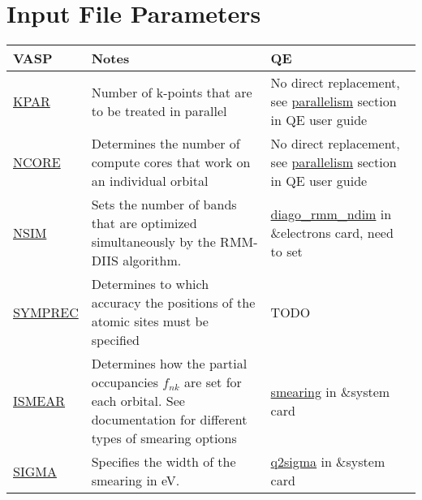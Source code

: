 \documentclass[12pt]{article}
\begin{document}
\section*{Input File Parameters}
\begin{center}
\begin{table}[ht]
\begin{tabularx}{\linewidth}{|>{\RaggedRight}p{2.5cm}|x|x|}\hline
 VASP  & Notes & QE \\ \hline
 
 
 \href{https://www.vasp.at/wiki/index.php/KPAR}{KPAR} &
 Number of k-points that are to be treated in parallel &
No direct replacement, see \href{https://www.quantum-espresso.org/Doc/user_guide/node17.html}{parallelism} section in QE user guide \\ \hline

 \href{https://www.vasp.at/wiki/index.php/NCORE}{NCORE} &
 Determines the number of compute cores that work on an individual orbital &
 No direct replacement, see \href{https://www.quantum-espresso.org/Doc/user_guide/node17.html}{parallelism} section in QE user guide \\ \hline

 \href{https://www.vasp.at/wiki/index.php/NSIM}{NSIM} &
 Sets the number of bands that are optimized simultaneously by the RMM-DIIS algorithm. &
 \href{https://www.quantum-espresso.org/Doc/INPUT_PW.html#idm1487}{diago\_rmm\_ndim} in \&electrons card, need to set  \\ \hline

 \href{https://www.vasp.at/wiki/index.php/SYMPREC}{SYMPREC} &
 Determines to which accuracy the positions of the atomic sites must be specified &
 TODO \\ \hline
 
 \href{https://www.vasp.at/wiki/index.php/ISMEAR}{ISMEAR} &
 Determines how the partial occupancies $f_{nk}$ are set for each orbital. See documentation for different types of smearing options &
 \href{https://www.quantum-espresso.org/Doc/INPUT_PW.html#idm382}{smearing} in \&system card \\ \hline
 
 \href{https://www.vasp.at/wiki/index.php/SIGMA}{SIGMA} &
 Specifies the width of the smearing in eV. &
 \href{https://www.quantum-espresso.org/Doc/INPUT_PW.html#idm406}{q2sigma} in \&system card \\ \hline
 

\end{tabularx}
\end{table}
\end{center}
\end{document}
